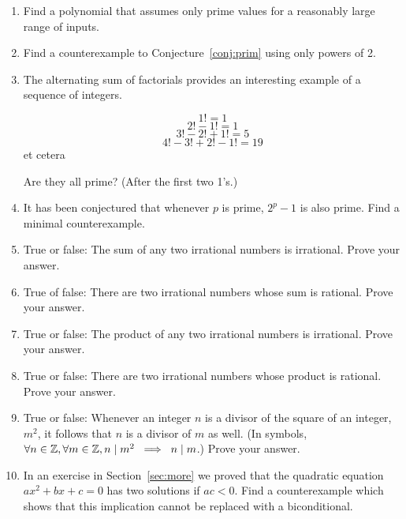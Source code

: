 \begin{enumerate}
\item Find a polynomial that assumes only prime values for
a reasonably large range of inputs.
\item Find a counterexample to Conjecture~\ref{conj:prim} using 
only powers of 2.
\item The alternating sum of factorials provides an interesting
example of a sequence of integers.
\begin{center}
\[ 1! = 1 \]
\[ 2! - 1! = 1\]
\[ 3! - 2! + 1! = 5 \]
\[ 4! - 3! + 2! - 1! = 19 \]
et cetera
\end{center}

\noindent Are they all prime?  (After the first two 1's.)
\item It has been conjectured that whenever $p$ is prime, $2^p - 1$ is
also prime.  Find a minimal counterexample.

\item True or false:  The sum of any two irrational numbers is irrational.
Prove your answer.

\item True of false:  There are two irrational numbers whose sum is rational.
Prove your answer.

\item True or false: The product of any two irrational numbers is irrational.
Prove your answer.

\item True or false: There are two irrational numbers whose product is rational.
Prove your answer.

\item True or false:  Whenever an integer $n$ is a divisor of the square of an integer, $m^2$, it follows that $n$ is a divisor of $m$ as well.
(In symbols, $\forall n \in {\mathbb Z}, \forall m \in {\mathbb Z}, n \mid m^2 \; \implies \; n \mid m$.)
Prove your answer.

\item In an exercise in Section~\ref{sec:more} we proved that the quadratic 
equation $ax^2 + bx + c = 0$ has two solutions if $ac < 0$.  Find a counterexample which shows that this implication cannot be replaced with a biconditional.  

\end{enumerate}
